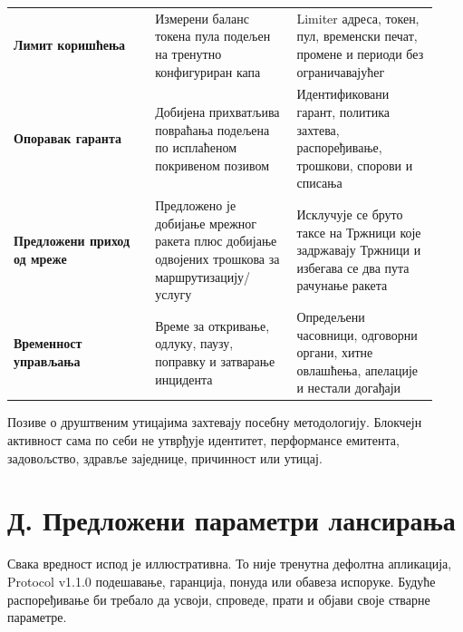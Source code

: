 \documentclass[11pt]{article}
\begin{document}
\begin{longtable}{P{0.31\linewidth} P{0.31\linewidth} P{0.31\linewidth}}
\textbf{Лимит коришћења} & Измерени баланс токена пула подељен на тренутно конфигуриран капа & Limiter адреса, токен, пул, временски печат, промене и периоди без ограничавајућег \\
\textbf{Опоравак гаранта} & Добијена прихватљива повраћања подељена по исплаћеном покривеном позивом & Идентификовани гарант, политика захтева, распоређивање, трошкови, спорови и списања \\
\textbf{Предложени приход од мреже} & Предложено је добијање мрежног ракета плюс добијање одвојених трошкова за маршрутизацију/услугу & Исклучује се бруто таксе на Тржници које задржавају Тржници и избегава се два пута рачунање ракета \\
\textbf{Временност управљања} & Време за откривање, одлуку, паузу, поправку и затварање инцидента & Опредељени часовници, одговорни органи, хитне овлашћења, апелације и нестали догађаји \\
\bottomrule
\end{longtable}

Позиве о друштвеним утицајима захтевају посебну методологију. Блокчејн активност сама по себи не утврђује идентитет, перформансе емитента, задовољство, здравље заједнице, причинност или утицај.


\section*{Д. Предложени параметри лансирања}

Свака вредност испод је иллюстративна. То није тренутна дефолтна апликација, Protocol v1.1.0 подешавање, гаранција, понуда или обавеза испоруке. Будуће распоређивање би требало да усвоји, спроведе, прати и објави своје стварне параметре.
\end{document}
